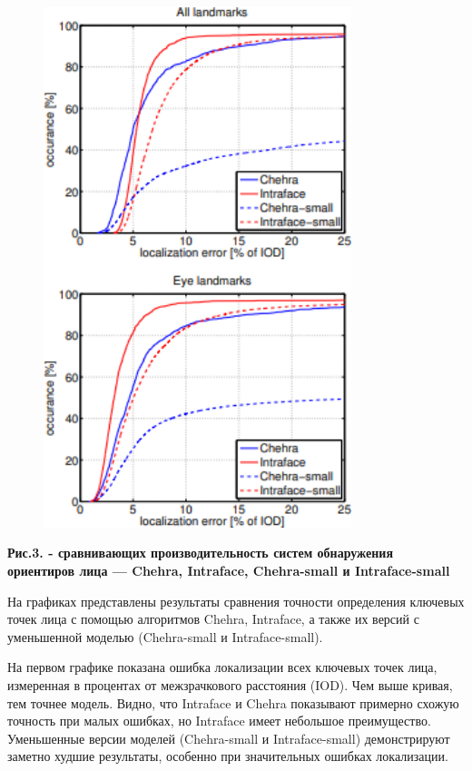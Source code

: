 \begin{figure}[H]
	\centering
	\includegraphics[width=0.8\textwidth]{media/ict/image17}
	\caption*{}
\end{figure}


{\bfseries Рис.3. - сравнивающих производительность систем обнаружения
ориентиров лица --- Chehra, Intraface, Chehra-small и Intraface-small}

На графиках представлены результаты сравнения точности определения
ключевых точек лица с помощью алгоритмов Chehra, Intraface, а также их
версий с уменьшенной моделью (Chehra-small и Intraface-small).

На первом графике показана ошибка локализации всех ключевых точек лица,
измеренная в процентах от межзрачкового расстояния (IOD). Чем выше
кривая, тем точнее модель. Видно, что Intraface и Chehra показывают
примерно схожую точность при малых ошибках, но Intraface имеет небольшое
преимущество. Уменьшенные версии моделей (Chehra-small и
Intraface-small) демонстрируют заметно худшие результаты, особенно при
значительных ошибках локализации.


